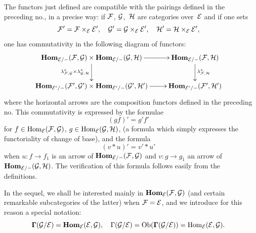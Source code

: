 The functors just defined are compatible with the
pairings defined in the preceding no., in a precise way: if $\cal{F}$, $\cal{G}$,~$\cal{H}$ are
categories over~$\cal{E}$ and if one sets
$$
\cal{F}'=\cal{F}\times_{\cal{E}}\cal{E}'\quoi,\quad \cal{G}'=
\cal{G}\times_{\cal{E}}\cal{E}'\quoi,\quad \cal{H}'=
\cal{H}\times_{\cal{E}}\cal{E}'\quoi,
$$
one has commutativity in the following diagram of functors:
$$
\xymatrix{ \SheafHom_{\cal{E}/-}(\cal{F},\cal{G})\times
\SheafHom_{\cal{E}/-}(\cal{G},\cal{H}) \ar[r]
\ar[d]_{\lambda^*_{\cal{F},\cal{G}}\times \lambda^*_{\cal{G},\cal{H}}}
& \SheafHom_{\cal{E}/-}(\cal{F},\cal{H})
\ar[d]^{\lambda^*_{\cal{F},\cal{H}}} \\
\SheafHom_{\cal{E}'/-}(\cal{F}',\cal{G}')\times
\SheafHom_{\cal{E}'/-}(\cal{G}',\cal{H}')\ar[r] &
\SheafHom_{\cal{E}'/-}(\cal{F}',\cal{H}')}
$$
where the horizontal arrows are the composition functors
defined in the preceding no. This commutativity
is expressed by the formulae
$$
(gf)'=g'f'
$$
for $f\in\Hom_{\cal{E}}(\cal{F},\cal{G})$,
$g\in\Hom_{\cal{E}}(\cal{G},\cal{H})$, (a formula which simply expresses
the functoriality of change of base), and the formula
$$
(v*u)'=v'*u'
$$
when $u\colon f\to f_1$ is an arrow of
$\SheafHom_{\cal{E}/-}(\cal{F},\cal{G})$ and $v\colon g\to g_1$ an
arrow of~$\SheafHom_{\cal{E}/-}(\cal{G},\cal{H})$. The
verification of this formula follows easily from the
definitions.

In the sequel, we shall be interested mainly in
$\SheafHom_{\cal{E}}(\cal{F},\cal{G})$ (and certain
remarkable subcategories of the latter) when
$\cal{F}=\cal{E}$, and we introduce for this reason a
special notation:
$$
\mathbf{\Gamma}(\cal{G}/\cal{E})=
\SheafHom_{\cal{E}}(\cal{E},\cal{G})\quoi,\quad
\Gamma(\cal{G}/\cal{E})=\Ob(\mathbf{\Gamma}(\cal{G}/\cal{E}))=
\Hom_{\cal{E}}(\cal{E},\cal{G})\quoi.
$$

